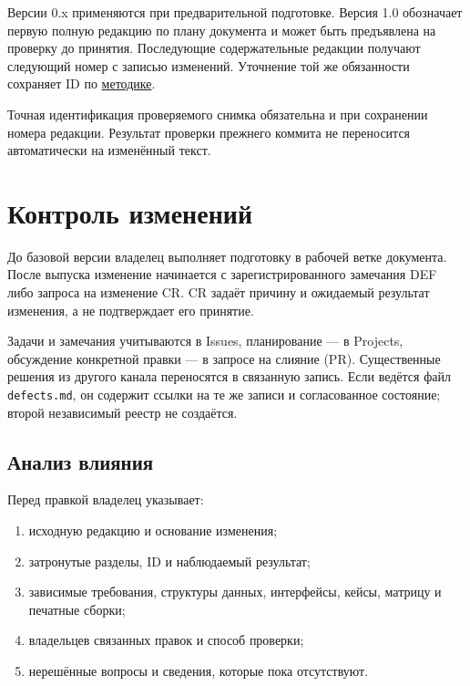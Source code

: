 \documentclass[12pt,a4paper]{article}
\newcommand{\tightlist}{\setlength{\itemsep}{0pt}\setlength{\parskip}{0pt}}
\begin{document}
Версии 0.x применяются при предварительной подготовке. Версия 1.0 обозначает первую полную редакцию по плану документа и может быть предъявлена на проверку до принятия. Последующие содержательные редакции получают следующий номер с записью изменений. Уточнение той же обязанности сохраняет ID по {\href{../notes/methodology/Методика\_идентификаторов.pdf\#методика-идентификаторов}{методике}}.

Точная идентификация проверяемого снимка обязательна и при сохранении номера редакции. Результат проверки прежнего коммита не переносится автоматически на изменённый текст.

\section{Контроль изменений}\label{5-ux43aux43eux43dux442ux440ux43eux43bux44c-ux438ux437ux43cux435ux43dux435ux43dux438ux439}

\hypertarget{5-контроль-изменений}{}

До базовой версии владелец выполняет подготовку в рабочей ветке документа. После выпуска изменение начинается с зарегистрированного замечания DEF либо запроса на изменение CR. CR задаёт причину и ожидаемый результат изменения, а не подтверждает его принятие.

Задачи и замечания учитываются в Issues, планирование --- в Projects, обсуждение конкретной правки --- в запросе на слияние (PR). Существенные решения из другого канала переносятся в связанную запись. Если ведётся файл \texttt{defects.md}, он содержит ссылки на те же записи и согласованное состояние; второй независимый реестр не создаётся.

\subsection{Анализ влияния}\label{ux430ux43dux430ux43bux438ux437-ux432ux43bux438ux44fux43dux438ux44f}

\hypertarget{анализ-влияния}{}

Перед правкой владелец указывает:

\begin{enumerate}
\def\labelenumi{\arabic{enumi}.}
\tightlist
\item
  исходную редакцию и основание изменения;
\item
  затронутые разделы, ID и наблюдаемый результат;
\item
  зависимые требования, структуры данных, интерфейсы, кейсы, матрицу и печатные сборки;
\item
  владельцев связанных правок и способ проверки;
\item
  нерешённые вопросы и сведения, которые пока отсутствуют.
\end{enumerate}
\end{document}

